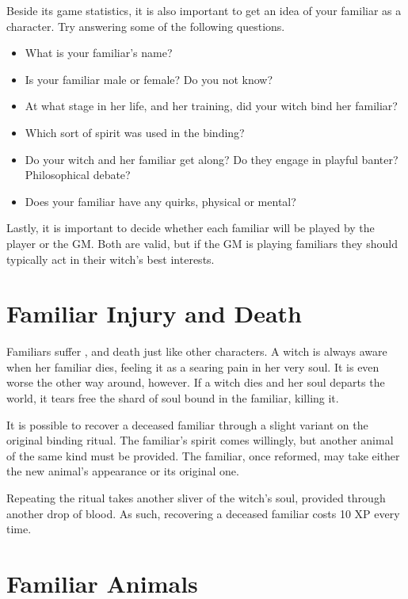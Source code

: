 Beside its game statistics, it is also important to get an idea of your familiar as a character.
Try answering some of the following questions.

\begin{itemize}
	\item What is your familiar's name?
	\item Is your familiar male or female?
		Do you not know?
	\item At what stage in her life, and her training, did your witch bind her familiar?
	\item Which sort of spirit was used in the binding? %
	\item Do your witch and her familiar get along?
		Do they engage in playful banter?
		Philosophical debate?
	\item Does your familiar have any quirks, physical or mental?
\end{itemize}

Lastly, it is important to decide whether each familiar will be played by the player or the GM.
Both are valid, but if the GM is playing familiars they should typically act in their witch's best interests.

\section{Familiar Injury and Death}

Familiars suffer {\damage}, {\shock} and death just like other characters.
A witch is always aware when her familiar dies, feeling it as a searing pain in her very soul.
It is even worse the other way around, however.
If a witch dies and her soul departs the world, it tears free the shard of soul bound in the familiar, killing it.

It is possible to recover a deceased familiar through a slight variant on the original binding ritual.
The familiar's spirit comes willingly, but another animal of the same kind must be provided.
The familiar, once reformed, may take either the new animal's appearance or its original one.

Repeating the ritual takes another sliver of the witch's soul, provided through another drop of blood.
As such, recovering a deceased familiar costs 10 XP every time.

\section{Familiar Animals}

